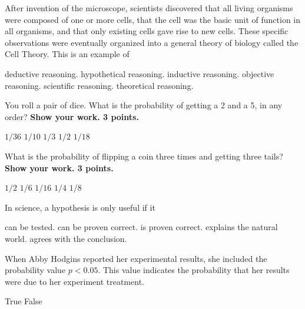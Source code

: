 \question
After invention of the microscope, scientists discovered that all living organisms were composed of one or more cells, that the cell was the basic unit of function in all organisms, and that only existing cells gave rise to new cells. These specific observations were eventually organized into a general theory of biology called the Cell Theory. This is an example of 

\begin{choices}
\choice deductive reasoning.%
\choice hypothetical reasoning.%
\correctchoice inductive reasoning.%
\choice objective reasoning.%
\choice scientific reasoning.%
\choice theoretical reasoning.%
\end{choices}

\question
You roll a pair of dice.  What is the probability of getting a 2 and a 5, in any order? \textbf{Show your work.  3 points.}

\begin{choices}
\choice $1/36$%
\choice $1/10$%
\choice $1/3$%
\choice $1/2$%
\correctchoice $1/18$%
\end{choices}

\question
What is the probability of flipping a coin three times and getting three tails? \textbf{Show your work. 3 points.}

\begin{choices}
\choice $1/2$%
\choice $1/6$%
\choice $1/16$%
\choice $1/4$%
\correctchoice $1/8$%
\end{choices}

\question
In science, a hypothesis is only useful if it

\begin{choices}
\correctchoice can be tested.%
\choice can be proven correct.%
\choice is proven correct.%
\choice explains the natural world.%
\choice agrees with the conclusion.%
\end{choices}

\question
When Abby Hodgins reported her experimental results, she included the probability value  $p < 0.05$.  This value indicates the probability that her results were due to her experiment treatment.

\begin{choices}
\choice True%
\correctchoice False%
\end{choices}

